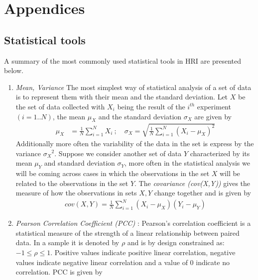 
\chapter{Appendices}
\label{AppendixA}

\section{Statistical tools} %
\label{appendix:stat_tools}
	A summary of the most commonly used statistical tools in HRI are presented below.
\begin{enumerate}[leftmargin={0.5cm},topsep={0pt},itemsep={0pt},partopsep={0pt},parsep={0pt}] 
\item \emph{Mean, Variance} The most simplest way of statistical analysis of a set of data is to represent them with their mean and the standard deviation. Let $X$ be the set of data collected with $X_i$ being the result of the $i^{th}$ experiment $(i = 1..N)$, the mean $\mu_X$ and the standard deviation $\sigma_X$ are given by
\begin{align*}
\mu_X    &= \frac{1}{N} \sum_{i=1}^{N} X_i\ ; \quad \sigma_X = \sqrt{\frac{1}{N} \sum_{i=1}^{N} (X_i - \mu_X)^2}
\end{align*}
Additionally more often the variability of the data in the set is express by the variance ${\sigma_X}^2$. Suppose we consider another set of data $Y$ characterized by its mean $\mu_Y$ and standard deviation $\sigma_Y$, more often in the statistical analysis we will be coming across cases in which the observations in the set $X$ will be related to the observations in the set $Y$. The \emph{covariance (cov(X,Y))} gives the measure of how the observations in sets $X,Y$ change together and is given by
\begin{align*}
cov(X,Y) = \frac{1}{N} \sum_{i=1}^{N} (X_i - \mu_X) (Y_i - \mu_Y) 
\end{align*}
\item \emph{Pearson Correlation Coefficient (PCC)} : Pearson’s correlation coefficient is a statistical measure of the strength of a linear relationship between paired data. In a sample it is denoted by $\rho$ and is by design constrained as: $-1 \leq \rho \leq 1$. Positive values indicate positive linear correlation, negative values indicate negative linear correlation and a value of 0 indicate no correlation. PCC is given by

\end{enumerate}
